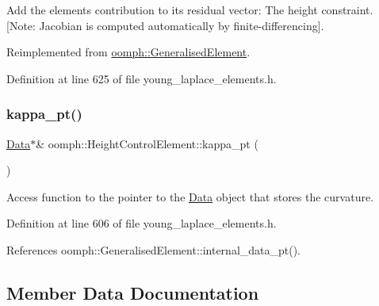 Add the element\textquotesingle{}s contribution to its residual vector\+: The height constraint. \mbox{[}Note\+: Jacobian is computed automatically by finite-\/differencing\mbox{]}. 



Reimplemented from \hyperlink{classoomph_1_1GeneralisedElement_a310c97f515e8504a48179c0e72c550d7}{oomph\+::\+Generalised\+Element}.



Definition at line 625 of file young\+\_\+laplace\+\_\+elements.\+h.

\mbox{\label{classoomph_1_1HeightControlElement_ac99cf23c634731656b17c18ece472b85}} 
\subsubsection{\texorpdfstring{kappa\+\_\+pt()}{kappa\_pt()}}
{\footnotesize\ttfamily \hyperlink{classoomph_1_1Data}{Data}$\ast$\& oomph\+::\+Height\+Control\+Element\+::kappa\+\_\+pt (\begin{DoxyParamCaption}{ }\end{DoxyParamCaption})\hspace{0.3cm}{\ttfamily [inline]}}



Access function to the pointer to the \hyperlink{classoomph_1_1Data}{Data} object that stores the curvature. 



Definition at line 606 of file young\+\_\+laplace\+\_\+elements.\+h.



References oomph\+::\+Generalised\+Element\+::internal\+\_\+data\+\_\+pt().



\subsection{Member Data Documentation}
\mbox{\label{classoomph_1_1HeightControlElement_a7950b34b4d99cf59df12a1c458b42540}} 
